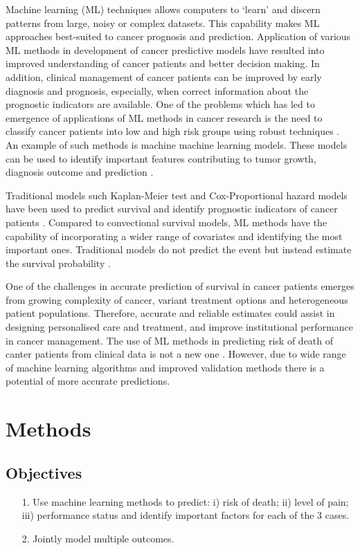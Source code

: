 Machine learning (ML) techniques allows computers to `learn' and discern patterns from large, noisy or complex datasets. This capability makes ML approaches best-suited to cancer prognosis and prediction. Application of various ML methods in development of cancer predictive models have resulted into improved understanding of cancer patients and better decision making. In addition, clinical management of cancer patients can be improved by early diagnosis and prognosis, especially, when correct information about the prognostic indicators are available. One of the problems which has led to emergence of applications of ML methods in cancer research is the need to classify cancer patients into low and high risk groups using robust techniques \cite{kourou2015machine}. An example of such methods is machine machine learning models. These models can be used to identify important features contributing to tumor growth, diagnosis outcome and prediction \citep{montazeri2016machine}.

Traditional models such Kaplan-Meier test and Cox-Proportional hazard models have been used to predict survival and identify prognostic indicators of cancer patients \citep{ganggayah2019predicting}. Compared to convectional survival models, ML methods have the capability of incorporating a wider range of covariates and identifying the most important ones. Traditional models do not predict the event but instead estimate the survival probability \citep{delen2005predicting}.

One of the challenges in accurate prediction of survival in cancer patients emerges from growing complexity of cancer, variant treatment options and heterogeneous patient populations. Therefore, accurate and reliable estimates could assist in designing personalised care and treatment, and improve institutional performance in cancer management. The use of ML methods in predicting risk of death of canter patients from clinical data is not a new one \citep{gupta2014machine}. However, due to wide range of machine learning algorithms and improved validation methods there is a potential of more accurate predictions.


\section{Methods}
\subsection{Objectives}
\begin{itemize}
\item[1.] Use machine learning methods to predict: i) risk of death; ii) level of pain; iii) performance status and identify important factors for each of the 3 cases.
\item[2.] Jointly model multiple outcomes.
\end{itemize}

